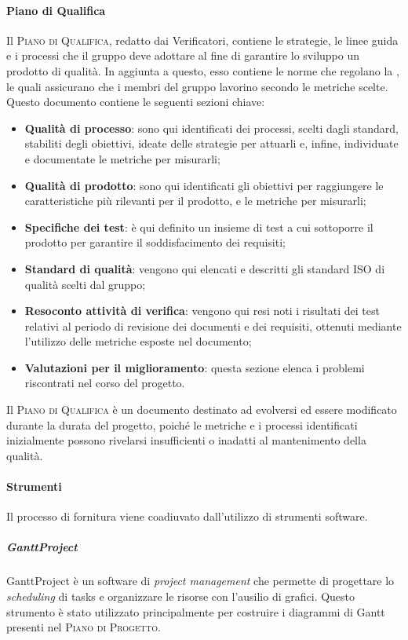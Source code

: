 \documentclass[../norme-di-progetto.tex]{subfiles}
\begin{document}
\paragraph{Piano di Qualifica}
Il \textsc{Piano di Qualifica}, redatto dai Verificatori, contiene le strategie, le linee guida e i processi che il gruppo deve adottare al fine di garantire lo sviluppo un prodotto di qualità. In aggiunta a questo, esso contiene le norme che regolano la , le quali assicurano che i membri del gruppo lavorino secondo le metriche scelte. \\
Questo documento contiene le seguenti sezioni chiave:
\begin{itemize}
  \item \textbf{Qualità di processo}: sono qui identificati dei processi, scelti dagli standard, stabiliti degli obiettivi, ideate delle strategie per attuarli e, infine, individuate e documentate le metriche per misurarli;
  \item \textbf{Qualità di prodotto}: sono qui identificati gli obiettivi per raggiungere le caratteristiche più rilevanti per il prodotto, e le metriche per misurarli;
  \item \textbf{Specifiche dei test}: è qui definito un insieme di test a cui sottoporre il prodotto per garantire il soddisfacimento dei requisiti;
  \item \textbf{Standard di qualità}: vengono qui elencati e descritti gli standard ISO di qualità scelti dal gruppo;
  \item \textbf{Resoconto attività di verifica}: vengono qui resi noti i risultati dei test relativi al periodo di revisione dei documenti e dei requisiti, ottenuti mediante l'utilizzo delle metriche esposte nel documento;
  \item \textbf{Valutazioni per il miglioramento}: questa sezione elenca i problemi riscontrati nel corso del progetto.
\end{itemize}
Il \textsc{Piano di Qualifica} è un documento destinato ad evolversi ed essere modificato durante la durata del progetto, poiché le metriche e i processi identificati inizialmente possono rivelarsi insufficienti o inadatti al mantenimento della qualità.
\paragraph{Strumenti}
Il processo di fornitura viene coadiuvato dall'utilizzo di strumenti software.
\subparagraph{GanttProject}
GanttProject è un software di \textit{project management} che permette di progettare lo \textit{scheduling} di tasks e organizzare le risorse con l'ausilio di grafici. Questo strumento è stato utilizzato principalmente per costruire i diagrammi di Gantt presenti nel \textsc{Piano di Progetto}.
\end{document}
